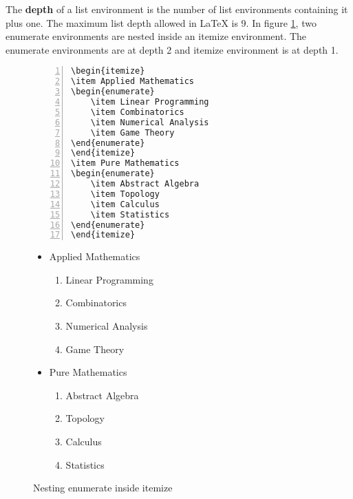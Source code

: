 \documentclass{article}
\begin{document}
The \textbf{depth} of a list environment is the number of list environments containing it plus one. The maximum list depth allowed in \LaTeX{} is 9. In figure \ref{fig:nestedEnvironment}, two enumerate environments are nested inside an itemize environment. The enumerate environments are at depth 2 and itemize environment is at depth 1.
\begin{figure}[h]
\centering
\begin{minipage}{0.45\textwidth}
\begin{Verbatim}[numbers = left]
\begin{itemize}
\item Applied Mathematics
\begin{enumerate}
	\item Linear Programming
	\item Combinatorics
	\item Numerical Analysis
	\item Game Theory
\end{enumerate}
\end{itemize}
\item Pure Mathematics
\begin{enumerate}
	\item Abstract Algebra
	\item Topology
	\item Calculus
	\item Statistics
\end{enumerate}
\end{itemize}
\end{Verbatim}
\end{minipage}
\begin{minipage}{0.45\textwidth}
\begin{itemize}
	\item Applied Mathematics
	\begin{enumerate}
		\item Linear Programming
		\item Combinatorics
		\item Numerical Analysis
		\item Game Theory
	\end{enumerate}
	\item Pure Mathematics
	\begin{enumerate}
		\item Abstract Algebra
		\item Topology
		\item Calculus
		\item Statistics
	\end{enumerate}
\end{itemize}
\end{minipage} 
\caption{Nesting enumerate inside itemize}
\label{fig:nestedEnvironment}
\end{figure}
\end{document}
